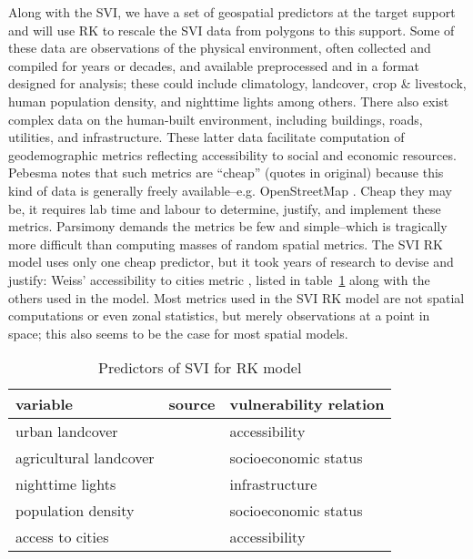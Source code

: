 Along with the SVI, we have a set of geospatial predictors at the target support and will use RK to rescale the SVI data from polygons to this support.  Some of these data are observations of the physical environment, often collected and compiled for years or decades, and available preprocessed and in a format designed for analysis; these could include climatology, landcover, crop \& livestock, human population density, and nighttime lights among others.  There also exist complex data on the human-built environment, including buildings, roads, utilities, and infrastructure.  These latter data facilitate computation of geodemographic metrics reflecting accessibility to social and economic resources.  Pebesma \citep{pebesma06} notes that such metrics are ``cheap'' (quotes in original) because this kind of data is generally freely available--e.g. OpenStreetMap \citep{osm}.  Cheap they may be, it requires lab time and labour to determine, justify, and implement these metrics.  Parsimony demands the metrics be few and simple--which is tragically more difficult than computing masses of random spatial metrics.  The SVI RK model uses only one cheap predictor, but it took years of research to devise and justify: Weiss' accessibility to cities metric \citep{weiss18}, listed in table~\ref{tab:predictors} along with the others used in the model.  Most metrics used in the SVI RK model are not spatial computations or even zonal statistics, but merely observations at a point in space; this also seems to be the case for most spatial models.

\begin{table}
  \begin{tabular}{l p{5cm} l}
    \hline
    \bf{variable} & \bf{source} & \bf{vulnerability relation} \\
    \hline
    urban landcover & \citep{basevue13} & accessibility \\
    agricultural landcover & \citep{basevue13} & socioeconomic status \\
    nighttime lights & \citep{elvidge17} & infrastructure \\
    population density & \citep{landscan} & socioeconomic status \\
    access to cities & \citep{weiss18} & accessibility \\
    \hline
  \end{tabular}
  \caption{Predictors of SVI for RK model} \label{tab:predictors}
\end{table}

